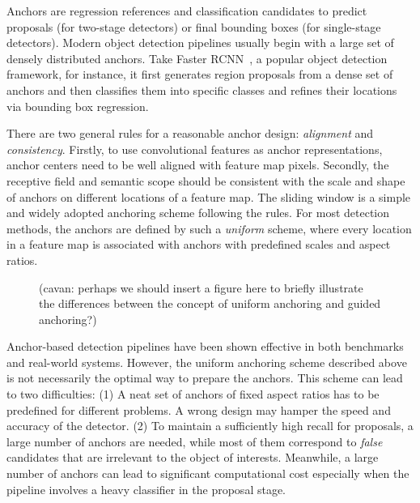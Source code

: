 \documentclass[10pt,twocolumn,letterpaper]{article}
\newcommand{\cavan}[1]{{\color{blue}(cavan: {#1})}}
\begin{document}
Anchors are regression references and classification candidates to predict proposals
(for two-stage detectors) or final bounding boxes (for single-stage detectors).
Modern object detection pipelines usually begin with a large set of densely distributed anchors.
Take Faster RCNN~\cite{ren2015faster}, a popular object detection framework, for instance,
it first generates region proposals from a dense set of anchors and then
classifies them into specific classes and refines their locations via
bounding box regression.

There are two general rules for a reasonable anchor design: \emph{alignment} and \emph{consistency}.
Firstly, to use convolutional features as anchor representations, anchor centers
need to be well aligned with feature map pixels.
Secondly, the receptive field and semantic scope should be consistent with the scale and shape of anchors on different locations of a feature map.
The sliding window is a simple and widely adopted anchoring scheme following the rules.
For most detection methods, the anchors are defined by such a \emph{uniform}
scheme, where every location in a feature map is associated with  anchors
with predefined scales and aspect ratios.

\begin{figure}[t]
\begin{center}
\vspace{6cm}
\caption{\cavan{perhaps we should insert a figure here to briefly illustrate the differences between the concept of uniform anchoring and guided anchoring?}\color{red}{maybe there is not enough space, and we tried to add such a figure but it is not easy to illustrate.}}
\label{fig:intro}
\end{center}
\end{figure}
\fi

Anchor-based detection pipelines have been shown effective in both
benchmarks~\cite{everingham2015pascal,lin2014microsoft,geiger2012we,deng2009imagenet}
and real-world systems.
However, the uniform anchoring scheme described above is not necessarily
the optimal way to prepare the anchors.
This scheme can lead to two difficulties:
(1) A neat set of anchors of fixed aspect ratios has to be predefined for different problems. A wrong design may hamper the speed and accuracy of the detector.
(2) To maintain a sufficiently high recall for proposals, a large number of
anchors are needed, while most of them correspond to \emph{false} candidates that are irrelevant to the object of interests.
Meanwhile, a large number of anchors can lead to significant computational cost especially
when the pipeline involves a heavy classifier in the proposal stage.
\end{document}
